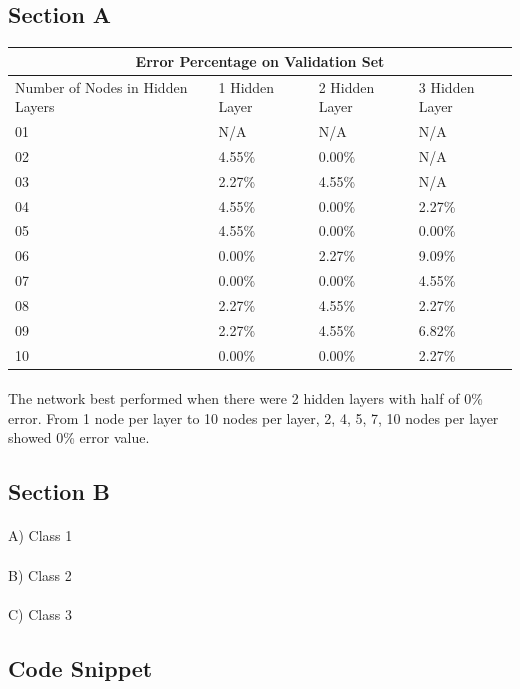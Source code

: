 \documentclass[12pt, letterpaper]{report}
\begin{document}
\subsection*{Section A}
\begin{tabular}{ |p{3cm}||p{3cm}|p{3cm}|p{3cm}|  }
	\hline
	\multicolumn{4}{|c|}{Error Percentage on Validation Set} \\
	\hline
	Number of Nodes in Hidden Layers&1 Hidden Layer&2 Hidden Layer&3 Hidden Layer\\
	\hline
	01&N/A&N/A&N/A\\
	02&4.55\%&0.00\%&N/A\\
	03&2.27\%&4.55\%&N/A\\
	04&4.55\%&0.00\%&2.27\%\\
	05&4.55\%&0.00\%&0.00\%\\
	06&0.00\%&2.27\%&9.09\%\\
	07&0.00\%&0.00\%&4.55\%\\
	08&2.27\%&4.55\%&2.27\%\\
	09&2.27\%&4.55\%&6.82\%\\
	10&0.00\%&0.00\%&2.27\%\\
	\hline
\end{tabular}
\paragraph*{} The network best performed when there were 2 hidden layers with half of 0\% error. From 1 node per layer to 10 nodes per layer, 2, 4, 5, 7, 10 nodes per layer showed 0\% error value.
\subsection*{Section B}
\paragraph*{} A) Class 1
\paragraph*{} B) Class 2
\paragraph*{} C) Class 3
\pagebreak
\subsection*{Code Snippet}


\end{document}
